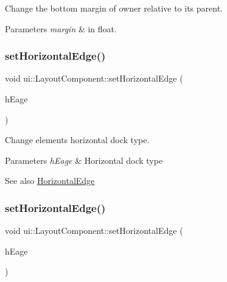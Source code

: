Change the bottom margin of owner relative to its parent. 
\begin{DoxyParams}{Parameters}
{\em margin} & in float. \\
\hline
\end{DoxyParams}
\mbox{\label{classui_1_1LayoutComponent_ad3f90ecb148baf2a40773d0d61c7a0fb}} 
\subsubsection{\texorpdfstring{set\+Horizontal\+Edge()}{setHorizontalEdge()}\hspace{0.1cm}{\footnotesize\ttfamily [1/2]}}
{\footnotesize\ttfamily void ui\+::\+Layout\+Component\+::set\+Horizontal\+Edge (\begin{DoxyParamCaption}\item[{\hyperlink{classui_1_1LayoutComponent_aaa61687a8a4e98f525413e1f0cfacf18}{Horizontal\+Edge}}]{h\+Eage }\end{DoxyParamCaption})}

Change element\textquotesingle{}s horizontal dock type. 
\begin{DoxyParams}{Parameters}
{\em h\+Eage} & Horizontal dock type \\
\hline
\end{DoxyParams}
\begin{DoxySeeAlso}{See also}
{\ttfamily \hyperlink{classui_1_1LayoutComponent_aaa61687a8a4e98f525413e1f0cfacf18}{Horizontal\+Edge}} 
\end{DoxySeeAlso}
\mbox{\label{classui_1_1LayoutComponent_ad3f90ecb148baf2a40773d0d61c7a0fb}} 
\subsubsection{\texorpdfstring{set\+Horizontal\+Edge()}{setHorizontalEdge()}\hspace{0.1cm}{\footnotesize\ttfamily [2/2]}}
{\footnotesize\ttfamily void ui\+::\+Layout\+Component\+::set\+Horizontal\+Edge (\begin{DoxyParamCaption}\item[{\hyperlink{classui_1_1LayoutComponent_aaa61687a8a4e98f525413e1f0cfacf18}{Horizontal\+Edge}}]{h\+Eage }\end{DoxyParamCaption})}

